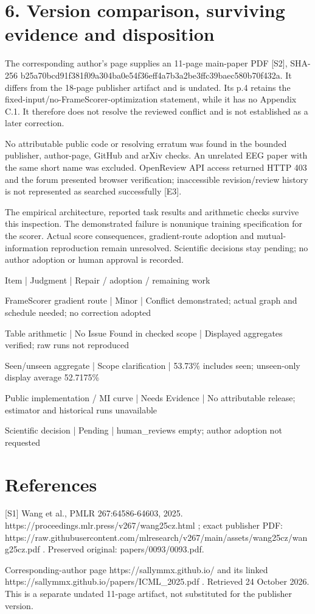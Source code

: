 \documentclass[10pt]{article}
\begin{document}
\section*{6. Version comparison, surviving evidence and disposition}
The corresponding author’s page supplies an 11-page main-paper PDF [S2], SHA-256 b25a70bcd91f381f09a304ba0e54f36eff4a7b3a2be3ffc39baec580b70f432a. It differs from the 18-page publisher artifact and is undated. Its p.4 retains the fixed-input/no-FrameScorer-optimization statement, while it has no Appendix C.1. It therefore does not resolve the reviewed conflict and is not established as a later correction.\par
No attributable public code or resolving erratum was found in the bounded publisher, author-page, GitHub and arXiv checks. An unrelated EEG paper with the same short name was excluded. OpenReview API access returned HTTP 403 and the forum presented browser verification; inaccessible revision/review history is not represented as searched successfully [E3].\par
The empirical architecture, reported task results and arithmetic checks survive this inspection. The demonstrated failure is nonunique training specification for the scorer. Actual score consequences, gradient-route adoption and mutual-information reproduction remain unresolved. Scientific decisions stay pending; no author adoption or human approval is recorded.\par
Item | Judgment | Repair / adoption / remaining work\par
FrameScorer gradient route | Minor | Conflict demonstrated; actual graph and schedule needed; no correction adopted\par
Table arithmetic | No Issue Found in checked scope | Displayed aggregates verified; raw runs not reproduced\par
Seen/unseen aggregate | Scope clarification | 53.73\% includes seen; unseen-only display average 52.7175\%\par
Public implementation / MI curve | Needs Evidence | No attributable release; estimator and historical runs unavailable\par
Scientific decision | Pending | human\_reviews empty; author adoption not requested\par
\section*{References}
[S1] Wang et al., PMLR 267:64586-64603, 2025. https://proceedings.mlr.press/v267/wang25cz.html ; exact publisher PDF: https://raw.githubusercontent.com/mlresearch/v267/main/assets/wang25cz/wang25cz.pdf . Preserved original: papers/0093/0093.pdf.\par
[S2] Corresponding-author page https://sallymmx.github.io/ and its linked https://sallymmx.github.io/papers/ICML\_2025.pdf . Retrieved 24 October 2026. This is a separate undated 11-page artifact, not substituted for the publisher version.\par
\end{document}
